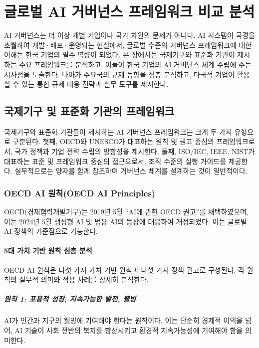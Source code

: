 \chapter{글로벌 AI 거버넌스 프레임워크 비교 분석}

AI 거버넌스는 더 이상 개별 기업이나 국가 차원의 문제가 아니다. AI 시스템이 국경을 초월하여 개발·배포·운영되는 현실에서, 글로벌 수준의 거버넌스 프레임워크에 대한 이해는 한국 기업의 필수 역량이 되었다.\cite{fjeld2020principled} 본 장에서는 국제기구와 표준화 기관이 제시하는 주요 프레임워크를 분석하고, 이들이 한국 기업의 AI 거버넌스 체계 수립에 주는 시사점을 도출한다. 나아가 주요국의 규제 동향을 심층 분석하고, 다국적 기업이 활용할 수 있는 통합 규제 대응 전략과 실무 도구를 제시한다.

\section{국제기구 및 표준화 기관의 프레임워크}
국제기구와 표준화 기관들이 제시하는 AI 거버넌스 프레임워크는 크게 두 가지 유형으로 구분된다. 첫째, OECD와 UNESCO가 대표하는 원칙 및 권고 중심의 프레임워크로서, 국가 정책과 기업 전략 수립의 방향성을 제시한다. 둘째, ISO/IEC, IEEE, NIST가 대표하는 표준 및 프레임워크 중심의 접근으로서, 조직 수준의 실행 가이드를 제공한다. 실무적으로는 양자를 함께 참조하여 거버넌스 체계를 설계하는 것이 일반적이다.

\subsection{OECD AI 원칙(OECD AI Principles)}
OECD(경제협력개발기구)는 2019년 5월 ``AI에 관한 OECD 권고''를 채택하였으며\cite{oecd2019principles}, 이는 2024년 5월 생성형 AI 및 범용 AI의 등장에 대응하여 개정되었다\cite{oecd2024framework}. 이는 글로벌 AI 정책의 기준점으로 기능한다.

\subsubsection{5대 가치 기반 원칙 심층 분석}

OECD AI 원칙은 다섯 가지 가치 기반 원칙과 다섯 가지 정책 권고로 구성된다. 각 원칙의 실무적 의미와 적용 사례를 상세히 분석한다.

\paragraph{원칙 1: 포용적 성장, 지속가능한 발전, 웰빙}
AI가 인간과 지구의 웰빙에 기여해야 한다는 원칙이다. 이는 단순히 경제적 이익을 넘어, AI 기술이 사회 전반의 복지를 향상시키고 환경적 지속가능성에 기여해야 함을 의미한다.

